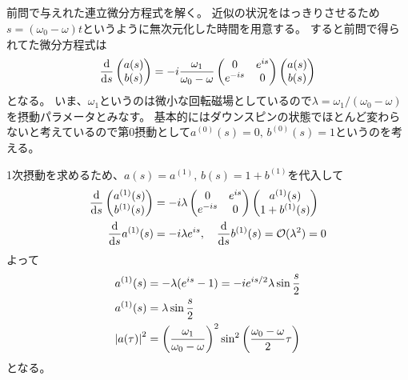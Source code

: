\documentclass[../ap_2022.tex]{subfiles}
\begin{document}
\subsection{}
前問で与えれた連立微分方程式を解く。
近似の状況をはっきりさせるため\(s = (\omega_0-\omega)t\)というように無次元化した時間を用意する。
すると前問で得られてた微分方程式は
\begin{equation}\begin{aligned}[b]
    \dv{s}\begin{pmatrix}
        a(s)\\
        b(s)
    \end{pmatrix}
    =-i\frac{\omega_1}{\omega_0-\omega}\begin{pmatrix}
        0 & e^{is}\\
        e^{-is} & 0
    \end{pmatrix}\begin{pmatrix}
        a(s)\\
        b(s)
    \end{pmatrix}
\end{aligned}\end{equation}
となる。
いま、\(\omega_1\)というのは微小な回転磁場としているので\(\lambda=\omega_1/(\omega_0-\omega)\)を摂動パラメータとみなす。
基本的にはダウンスピンの状態でほとんど変わらないと考えているので第0摂動として\(a^{(0)}(s)=0,\,b^{(0)}(s)=1\)というのを考える。

1次摂動を求めるため、\(a(s)=a^{(1)},\, b(s)=1+b^{(1)}\)を代入して
\begin{equation}\begin{aligned}[b]
    \dv{s}\begin{pmatrix}
        a^{(1)}(s)\\
        b^{(1)}(s)
    \end{pmatrix}
    &=-i\lambda\begin{pmatrix}
        0 & e^{is}\\
        e^{-is} & 0
    \end{pmatrix}\begin{pmatrix}
        a^{(1)}(s)\\
        1+b^{(1)}(s)
    \end{pmatrix}\\
    \dv{s}a^{(1)}(s) &=-i\lambda e^{is},\quad
    \dv{s}b^{(1)}(s) = \mathcal{O}(\lambda^2)=0
\end{aligned}\end{equation}
よって
\begin{equation}\begin{aligned}[b]
    a^{(1)}(s) &= -\lambda(e^{is}-1)=-ie^{is/2}\lambda \sin\frac{s}{2}\\
    a^{(1)}(s) &= \lambda \sin\frac{s}{2}\\
    \abs{a(\tau)}^2 &= \qty(\frac{\omega_1}{\omega_0-\omega})^2\sin^2\qty(\frac{\omega_0-\omega}{2}\tau)
\end{aligned}\end{equation}
となる。
\end{document}
